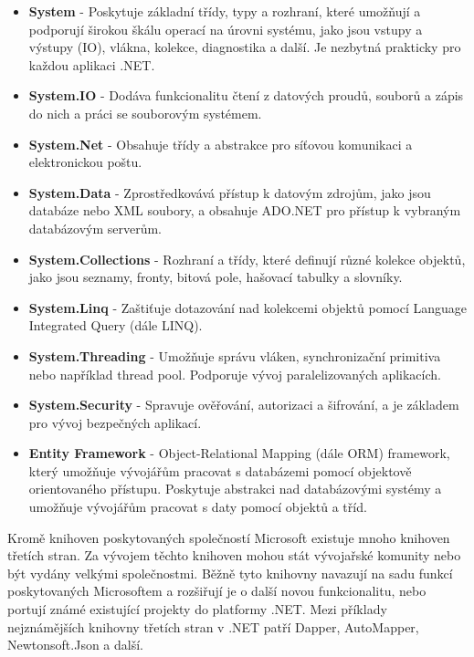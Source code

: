 \begin{itemize}
    \item \textbf{System} - Poskytuje základní třídy, typy a rozhraní, které umožňují a podporují širokou škálu operací na úrovni systému, jako jsou vstupy a výstupy (IO), vlákna, kolekce, diagnostika a další. Je nezbytná prakticky pro každou aplikaci .NET.
    \item \textbf{System.IO} - Dodáva funkcionalitu čtení z datových proudů, souborů a zápis do nich a práci se souborovým systémem.
    \item \textbf{System.Net} - Obsahuje třídy a abstrakce pro síťovou komunikaci a elektronickou poštu.
    \item \textbf{System.Data} - Zprostředkovává přístup k datovým zdrojům, jako jsou databáze nebo XML soubory, a obsahuje ADO.NET pro přístup k vybraným databázovým serverům.
    \item \textbf{System.Collections} - Rozhraní a třídy, které definují různé kolekce objektů, jako jsou seznamy, fronty, bitová pole, hašovací tabulky a slovníky.
    \item \textbf{System.Linq} - Zaštiťuje dotazování nad kolekcemi objektů pomocí Language Integrated Query (dále LINQ).
    \item \textbf{System.Threading} - Umožňuje správu vláken, synchronizační primitiva nebo například thread pool. Podporuje vývoj paralelizovaných aplikacích.
    \item \textbf{System.Security} - Spravuje ověřování, autorizaci a šifrování, a je základem pro vývoj bezpečných aplikací.
    \item \textbf{Entity Framework} - Object-Relational Mapping (dále ORM) framework, který umožňuje vývojářům pracovat s databázemi pomocí objektově orientovaného přístupu. Poskytuje abstrakci nad databázovými systémy a umožňuje vývojářům pracovat s daty pomocí objektů a tříd.
\end{itemize}

Kromě knihoven poskytovaných společností Microsoft existuje mnoho knihoven třetích stran. Za vývojem těchto knihoven mohou stát vývojařské komunity nebo být vydány velkými společnostmi. Běžně tyto knihovny navazují na sadu funkcí poskytovaných Microsoftem a rozšiřují je o další novou funkcionalitu, nebo portují známé existující projekty do platformy .NET. Mezi příklady nejznámějších knihovny třetích stran v .NET patří Dapper, AutoMapper, Newtonsoft.Json a další.


